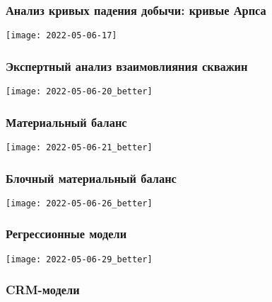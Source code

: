 \documentclass[main.tex]{subfiles}
\begin{document}



\subsubsection{Анализ кривых падения добычи: кривые Арпса}

\texttt{[image: 2022-05-06-17]}



\subsubsection{Экспертный анализ взаимовлияния скважин}

\texttt{[image: 2022-05-06-20\_better]}

\subsubsection{Материальный баланс}

\texttt{[image: 2022-05-06-21\_better]}





\subsubsection{Блочный материальный баланс}

\texttt{[image: 2022-05-06-26\_better]}



\subsubsection{Регрессионные модели}

\texttt{[image: 2022-05-06-29\_better]}

\subsubsection{CRM-модели}
\end{document}

